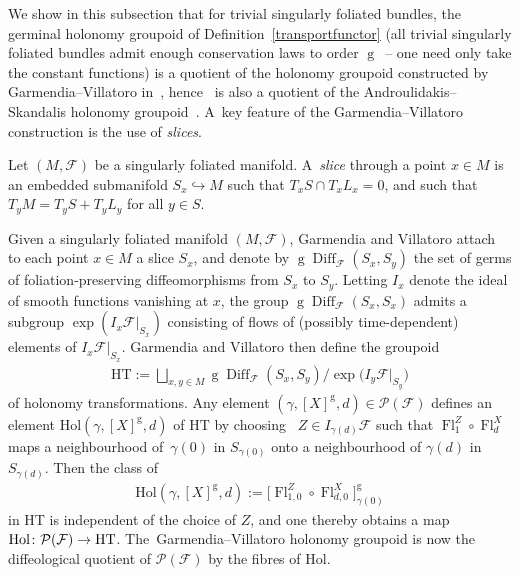 \documentclass[pdftex]{sigma}
\numberwithin{equation}{section}
\def\g{\operatorname{g}}
\def\Diff{\operatorname{Diff}}
\def\Fl{\operatorname{Fl}}
\def\FF{{\mathcal{F}}}
\def\PP{{\mathcal{P}}}
\begin{document}
We show in this subsection that for trivial singularly foliated bundles, the germinal holonomy groupoid of Definition~\ref{transportfunctor} (all trivial singularly foliated bundles admit enough conservation laws to order $\g$~-- one need only take the constant functions) is a quotient of the holonomy groupoid constructed by Garmendia--Villatoro in~\cite{VilGar1}, hence~\cite[Theorem~5.5]{VilGar1} is also a quotient of the Androulidakis--Skandalis holonomy groupoid~\cite{iakovos2}. A~key feature of the Garmendia--Villatoro con\-st\-ruction is the use of \textit{slices}.

\begin{Definition}
Let $(M,\FF)$ be a singularly foliated manifold. A~\textit{slice} through a point $x\in M$ is an embedded submanifold $S_{x}\hookrightarrow M$ such that $T_{x}S\cap T_{x}L_{x} = 0$, and such that $T_{y}M = T_{y}S+T_{y}L_{y}$ for all $y\in S$.
\end{Definition}

Given a singularly foliated manifold $(M,\FF)$, Garmendia and Villatoro attach to each point $x\in M$ a slice $S_{x}$, and denote by $\g\Diff_{\FF}(S_{x},S_{y})$ the set of germs of foliation-preserving diffeomorphisms from $S_{x}$ to $S_{y}$. Letting $I_{x}$ denote the ideal of smooth functions vanishing at $x$, the group $\g\Diff_{\FF}(S_{x},S_{x})$ admits a subgroup $\exp(I_{x}\FF|_{S_{x}})$ consisting of flows of (possibly time-dependent) elements of $I_{x}\FF|_{S_{x}}$. Garmendia and Villatoro then define the groupoid
\begin{gather*}
\text{HT}:=\bigsqcup_{x,y\in M}\g\Diff_{\FF}(S_{x},S_{y})/\exp\big(I_{y}\FF|_{S_{y}}\big)
\end{gather*}
of holonomy transformations. Any element $(\gamma,[X]^{\g},d)\in\PP(\FF)$ defines an element $\text{Hol}(\gamma,[X]^{\g},d)$ of $\text{HT}$ by choosing~\cite[Lemma~A.8]{iakovos4} $Z\in I_{\gamma(d)}\FF$ such that $\Fl^{Z}_{1}\circ\Fl^{X}_{d}$ maps a neighbourhood of~$\gamma(0)$ in $S_{\gamma(0)}$ onto a neighbourhood of $\gamma(d)$ in $S_{\gamma(d)}$. Then the class of
\begin{gather*}
\text{Hol}(\gamma,[X]^{\g},d):=\big[\Fl^{Z}_{1,0}\circ\Fl^{X}_{d,0}\big]^{\g}_{\gamma(0)}
\end{gather*}
in HT is independent of the choice of $Z$, and one thereby obtains a map $\text{Hol}\colon \PP(\FF)\rightarrow {\rm HT}$. The~Garmendia--Villatoro holonomy groupoid is now the diffeological quotient of $\PP(\FF)$ by the fibres of $\text{Hol}$.
\end{document}
